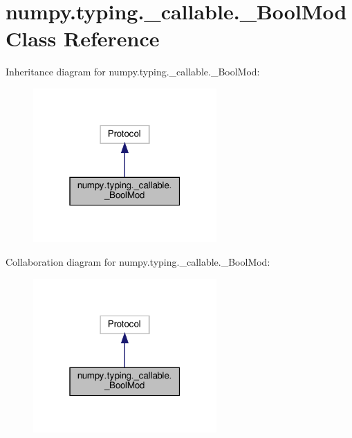 \hypertarget{classnumpy_1_1typing_1_1__callable_1_1__BoolMod}{}\section{numpy.\+typing.\+\_\+callable.\+\_\+\+Bool\+Mod Class Reference}
\label{classnumpy_1_1typing_1_1__callable_1_1__BoolMod}


Inheritance diagram for numpy.\+typing.\+\_\+callable.\+\_\+\+Bool\+Mod\+:
\nopagebreak
\begin{figure}[H]
\begin{center}
\leavevmode
\includegraphics[width=199pt]{classnumpy_1_1typing_1_1__callable_1_1__BoolMod__inherit__graph}
\end{center}
\end{figure}


Collaboration diagram for numpy.\+typing.\+\_\+callable.\+\_\+\+Bool\+Mod\+:
\nopagebreak
\begin{figure}[H]
\begin{center}
\leavevmode
\includegraphics[width=199pt]{classnumpy_1_1typing_1_1__callable_1_1__BoolMod__coll__graph}
\end{center}
\end{figure}
